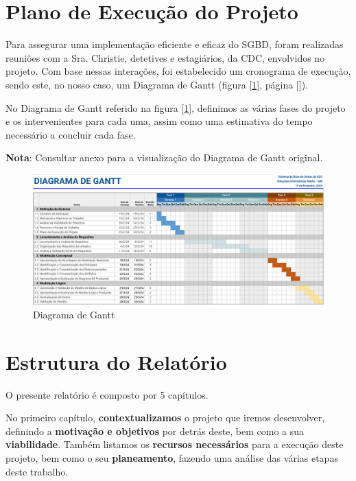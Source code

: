 \documentclass[a4paper,12pt]{scrreprt}
\begin{document}
    \section{Plano de Execução do Projeto}
        Para assegurar uma implementação eficiente e eficaz do SGBD, foram realizadas reuniões com a Sra$.$ Christie, detetives e estagiários, da CDC, envolvidos no projeto. Com base nessas interações, foi estabelecido um cronograma de execução, sendo este, no nosso caso, um Diagrama de Gantt (figura [\ref{fig:1.1}], página [\pageref{fig:1.1}]).

        No Diagrama de Gantt referido na figura [\ref{fig:1.1}], definimos as várias fases do projeto e os intervenientes para cada uma, assim como uma estimativa do tempo necessário a concluir cada fase.
        
        \textbf{Nota}: Consultar anexo \textit{} para a visualização do Diagrama de Gantt original.
        \begin{figure}
            \centering
            \includegraphics[scale=0.99, angle=270]{images/gantt.pdf}
            \caption{Diagrama de Gantt}
            \label{fig:1.1}
        \end{figure}


    \clearpage
    
    \section{Estrutura do Relatório}
    O presente relatório é composto por 5 capítulos.
    
    No primeiro capítulo, \textbf{contextualizamos} o projeto que iremos desenvolver, definindo a \textbf{motivação e objetivos} por detrás deste, bem como a sua \textbf{viabilidade}. Também listamos os \textbf{recursos necessários} para a execução deste projeto, bem como o seu \textbf{planeamento}, fazendo uma análise das várias etapas deste trabalho.
\end{document}
